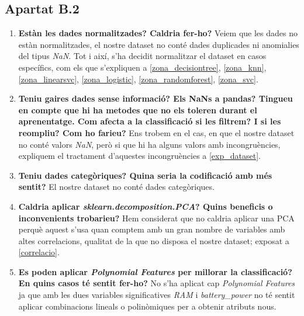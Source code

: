 \documentclass[a4paper, 11pt]{article}
\begin{document}
\subsection{Apartat B.2}
\begin{enumerate}
    \item \textbf{Estàn les dades normalitzades? Caldria fer-ho?}
    Veiem que les dades no estàn normalitzades, el nostre dataset no conté dades duplicades ni anomialies del tipus \textit{NaN}. Tot i així, s'ha decidit normalitzar el dataset en casos específics, com els que s'expliquen a \textcolor{blue}{\ref{zona_decisiontree}}, \textcolor{blue}{\ref{zona_knn}}, \textcolor{blue}{\ref{zona_linearsvc}}, \textcolor{blue}{\ref{zona_logistic}}, \textcolor{blue}{\ref{zona_randomforest}}, \textcolor{blue}{\ref{zona_svc}}.

    \item \textbf{Teniu gaires dades sense informació? Els NaNs a pandas? Tingueu en compte que hi ha metodes que no els toleren durant el aprenentatge. Com afecta a la classificació si les filtrem? I si les reompliu? Com ho farieu?}
    Ens trobem en el cas, en que el nostre dataset no conté valors \textit{NaN}, però si que hi ha alguns valors amb incongruències, expliquem el tractament d'aquestes incongruències a \textcolor{blue}{\ref{exp_dataset}}.
    
    \item \textbf{Teniu dades categòriques? Quina seria la codificació amb més sentit?}
    El nostre dataset no conté dades categòriques.
    
    \item \textbf{Caldria aplicar \textit{sklearn.decomposition.PCA}? Quins beneficis o inconvenients trobarieu?}
    Hem considerat que no caldria aplicar una PCA perquè aquest s'usa quan comptem amb un gran nombre de variables amb altes correlacions, qualitat de la que no disposa el nostre dataset; exposat a \textcolor{blue}{\ref{correlacio}}. 

   \item \textbf{Es poden aplicar \textit{Polynomial Features} per millorar la classificació? En quins casos té sentit fer-ho?} No s'ha aplicat cap \textit{Polynomial Features} ja que amb les dues variables significatives \textit{RAM} i \textit{battery\_power} no té sentit aplicar combinacions lineals o polinòmiques per a obtenir atributs nous.
\end{enumerate}
\newpage
\end{document}
